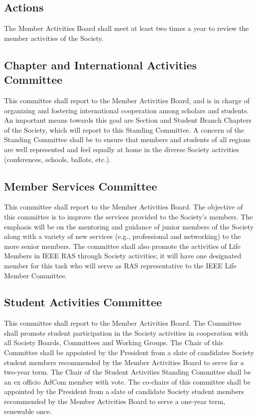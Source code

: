 \documentclass[10pt]{article}
\begin{document}
\subsection{Actions}
The Member Activities Board shall meet at least two times a year to review the member activities of the Society.


\subsection{Chapter and International Activities Committee}

This committee shall report to the Member Activities Board, and is in charge of organizing and fostering international cooperation among scholars and students. An important means towards this goal are Section and Student Branch Chapters of the Society, which will report to this Standing Committee.  A concern of the Standing Committee shall be to ensure that members and students of all regions are well represented and feel equally at home in the diverse Society activities (conferences, schools, ballots, etc.).



\subsection{Member Services Committee}
This committee shall report to the Member Activities Board. The objective of this committee is to improve the services provided to the Society's members. The emphasis will be on the mentoring and guidance of junior members of the Society along with a variety of new services (e.g., professional and networking) to the more senior members. The committee shall also promote the activities of Life Members in IEEE RAS through Society activities; it will have one designated member for this task who will serve as RAS representative to the IEEE Life Member Committee.


\subsection{Student Activities Committee}

This committee shall report to the Member Activities Board. The Committee shall promote student participation in the Society activities in cooperation with all Society Boards, Committees and Working Groups. The Chair of this Committee shall be appointed by the President from a slate of candidates Society student members recommended by the Member Activities Board to serve for a two-year term. The Chair of the Student Activities Standing Committee shall be an ex officio AdCom member with vote. The co-chairs of this committee shall be appointed by the President from a slate of candidate Society student members recommended by the Member Activities Board to serve a one-year term, renewable once.
\end{document}
